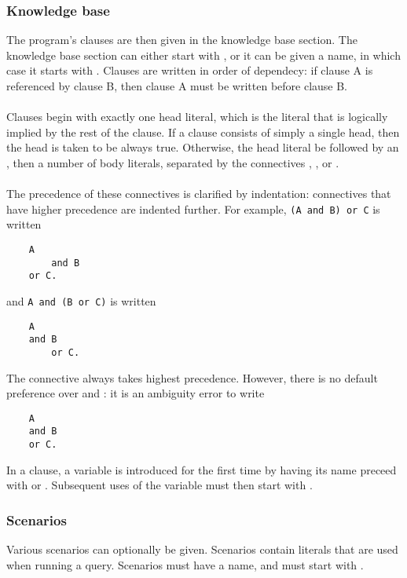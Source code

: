 \documentclass[../main.tex]{subfiles}
\begin{document}
\subsubsection{Knowledge base}
The program's clauses are then given in the knowledge base section. The knowledge base section can either start with , or it can be given a name, in which case it starts with . Clauses are written in order of dependecy: if clause A is referenced by clause B, then clause A must be written before clause B.
\\ 
\\
Clauses begin with exactly one head literal, which is the literal that is logically implied by the rest of the clause. If a clause consists of simply a single head, then the head is taken to be always true. Otherwise, the head literal be followed by an , then a number of body literals, separated by the connectives , , or .
\\ \\
The precedence of these connectives is clarified by indentation: connectives that have higher precedence are indented further. For example, \texttt{(A and B) or C} is written
\begin{lstlisting}
    A
        and B
    or C.
\end{lstlisting}
and \texttt{A and (B or C)} is written
\begin{lstlisting}
    A
    and B
        or C.
\end{lstlisting}
The connective  always takes highest precedence. However, there is no default preference over  and : it is an ambiguity error to write
\begin{lstlisting}
    A 
    and B
    or C.
\end{lstlisting}
In a clause, a variable is introduced for the first time by having its name preceed with  or . Subsequent uses of the variable must then start with .

\subsubsection{Scenarios}
Various scenarios can optionally be given. Scenarios contain literals that are used when running a query. Scenarios must have a name, and must start with 
. 
\end{document}
